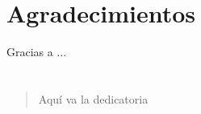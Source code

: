\chapter*{Agradecimientos}

Gracias a ...


\newpage
{}
\chapter*{}

\newenvironment{dedication}
    {\vspace{6ex}
    \begin{quotation}\begin{em}}
    {\par\end{em}
    \end{quotation}}

\begin{dedication}
Aquí va la dedicatoria
\end{dedication}
